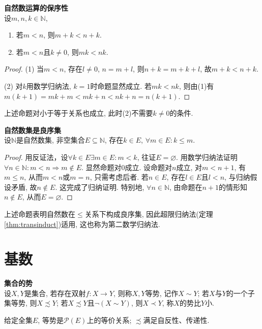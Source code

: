\begin{pro}\textbf{自然数运算的保序性}\\
设$m,n,k \in \mathbb{N}$,
\begin{enumerate}
    \item 若$m<n$, 则$m+k<n+k$.
    \item 若$m<n$且$k\neq 0$, 则$mk<nk$. 
\end{enumerate}
\label{pro:natural_preserve_order}
\end{pro}
\begin{proof}
(1) 当$m<n$, 存在$l\neq 0$, $n=m+l$, 则$n+k=m+k+l$, 故$m+k<n+k$. 
\par (2) 对$k$用数学归纳法, $k=1$时命题显然成立. 若$mk<nk$, 则由(1)有$m(k+1)=mk+m<mk+n<nk+n=n(k+1)$.
\end{proof}
上述命题对小于等于关系也成立, 此时(2)不需要$k\neq 0$的条件.

\begin{pro}\textbf{自然数集是良序集}\\
设$\mathbb{N}$是自然数集, 非空集合$E\subseteq \mathbb{N}$, 存在$k\in E$, $\forall m\in E: k\le m$.
\end{pro}
\begin{proof}
用反证法，设$\forall k\in E\exists m\in E: m<k$, 往证$E=\varnothing$. 用数学归纳法证明$\forall n\in \mathbb{N}: m<n\Rightarrow m\notin E$. 显然命题对0成立. 设命题对$n$成立, 对$m<n+1$, 有$m\le n$, 从而$m<n$或$m=n$, 只需考虑后者. 若$n\in E$, 存在$l\in E$且$l<n$, 与归纳假设矛盾, 故$n\notin E$. 这完成了归纳证明. 特别地, $\forall n\in \mathbb{N}$, 由命题在$n+1$的情形知 $n\notin E$, 从而$E=\varnothing$. 
\end{proof}
\par 上述命题表明自然数在$\le$关系下构成良序集, 因此超限归纳法(定理\ref{thm:transinduct})适用, 这也称为第二数学归纳法. 

\section{基数}

\begin{dfn} \textbf{集合的势}\\
设$X, Y$是集合, 若存在双射$f:X\to Y$, 则称$X,Y$等势, 记作$X\sim Y$; 若$X$与$Y$的一个子集等势, 则$X\precsim Y$; 若$X\precsim Y$且$\lnot (X\sim Y)$, 则$X\prec Y$, 称$X$的势比$Y$小. 
\end{dfn}
\par 给定全集$E$, 等势是$\mathcal{P}(E)$上的等价关系; $\precsim$满足自反性、传递性. 

